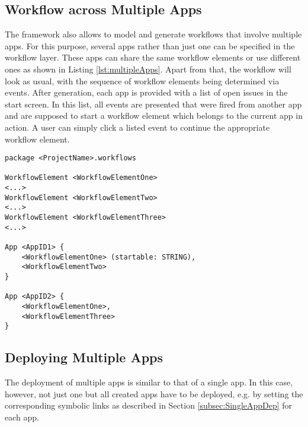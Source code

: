 
\subsection{Workflow across Multiple Apps}
\label{subsec:WorkflowMultipleApps}
The \MD framework also allows to model and generate workflows that involve multiple apps. For this purpose, several apps rather than just one can be specified in the workflow layer. These apps can share the same workflow elements or use different ones as shown in Listing \ref{lst:multipleApps}. Apart from that, the workflow will look as usual, with the sequence of workflow elements being determined via events. After generation, each app is provided with a list of open issues in the start screen. In this list, all events are presented that were fired from another app and are supposed to start a workflow element which belongs to the current app in action. A user can simply click a listed event to continue the appropriate workflow element.

\begin{lstlisting}[language=MD2, label=lst:multipleApps, caption=Workflow Definition for Multiple Apps]
package <ProjectName>.workflows

WorkflowElement <WorkflowElementOne>
<...>
WorkflowElement <WorkflowElementTwo>
<...>
WorkflowElement <WorkflowElementThree>
<...>

App <AppID1> {
	<WorkflowElementOne> (startable: STRING),
	<WorkflowElementTwo>
}

App <AppID2> {
	<WorkflowElementOne>,
	<WorkflowElementThree>
}
\end{lstlisting}


\subsection{Deploying Multiple Apps}
\label{subsec:DeploymentMultipleApps}

The deployment of multiple apps is similar to that of a single app. In this case, however, not just one but all created apps have to be deployed, e.g. by setting the corresponding symbolic links as described in Section \ref{subsec:SingleAppDep} for each app.
